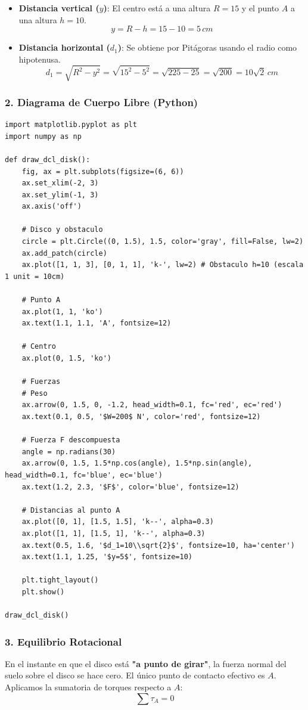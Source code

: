 \documentclass[12pt, a4paper]{article}
\begin{document}
\begin{itemize}
    \item \textbf{Distancia vertical ($y$)}: El centro está a una altura $R=15$ y el punto $A$ a una altura $h=10$.
    $$y = R - h = 15 - 10 = 5 \, \si{cm}$$
    \item \textbf{Distancia horizontal ($d_1$)}: Se obtiene por Pitágoras usando el radio como hipotenusa.
    $$d_1 = \sqrt{R^2 - y^2} = \sqrt{15^2 - 5^2} = \sqrt{225 - 25} = \sqrt{200} = 10\sqrt{2} \, \si{cm}$$
\end{itemize}

\subsubsection*{2. Diagrama de Cuerpo Libre (Python)}

\begin{lstlisting}
import matplotlib.pyplot as plt
import numpy as np

def draw_dcl_disk():
    fig, ax = plt.subplots(figsize=(6, 6))
    ax.set_xlim(-2, 3)
    ax.set_ylim(-1, 3)
    ax.axis('off')

    # Disco y obstaculo
    circle = plt.Circle((0, 1.5), 1.5, color='gray', fill=False, lw=2)
    ax.add_patch(circle)
    ax.plot([1, 1, 3], [0, 1, 1], 'k-', lw=2) # Obstaculo h=10 (escala 1 unit = 10cm)
    
    # Punto A
    ax.plot(1, 1, 'ko')
    ax.text(1.1, 1.1, 'A', fontsize=12)

    # Centro
    ax.plot(0, 1.5, 'ko')
    
    # Fuerzas
    # Peso
    ax.arrow(0, 1.5, 0, -1.2, head_width=0.1, fc='red', ec='red')
    ax.text(0.1, 0.5, '$W=200$ N', color='red', fontsize=12)
    
    # Fuerza F descompuesta
    angle = np.radians(30)
    ax.arrow(0, 1.5, 1.5*np.cos(angle), 1.5*np.sin(angle), head_width=0.1, fc='blue', ec='blue')
    ax.text(1.2, 2.3, '$F$', color='blue', fontsize=12)

    # Distancias al punto A
    ax.plot([0, 1], [1.5, 1.5], 'k--', alpha=0.3)
    ax.plot([1, 1], [1.5, 1], 'k--', alpha=0.3)
    ax.text(0.5, 1.6, '$d_1=10\\sqrt{2}$', fontsize=10, ha='center')
    ax.text(1.1, 1.25, '$y=5$', fontsize=10)

    plt.tight_layout()
    plt.show()

draw_dcl_disk()
\end{lstlisting}

\subsubsection*{3. Equilibrio Rotacional}
En el instante en que el disco está \textbf{"a punto de girar"}, la fuerza normal del suelo sobre el disco se hace cero. El único punto de contacto efectivo es $A$. Aplicamos la sumatoria de torques respecto a $A$:
$$\sum \tau_A = 0$$
\end{document}
